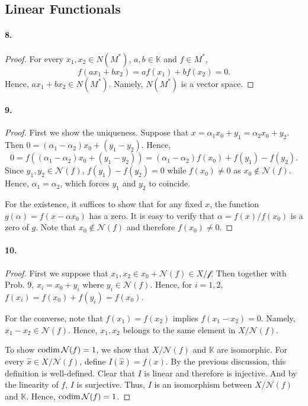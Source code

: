 \subsection{Linear Functionals}
  \paragraph{8.}
  \begin{proof}
    For every $x_1,x_2\in N(M^*)$, $a,b\in\mathbb{K}$ and $f\in M^*$,
    \[
      f(ax_1+bx_2) = af(x_1)+bf(x_2) = 0.
    \]
    Hence, $ax_1+bx_2\in N(M^*)$. Namely, $N(M^*)$ is a vector space.
  \end{proof}

  \paragraph{9.}
  \begin{proof}
    First we show the uniqueness. Suppose that $x=\alpha_1x_0+y_1=\alpha_2x_0+
    y_2$. Then $0 = (\alpha_1-\alpha_2)x_0 + (y_1-y_2)$. Hence,
    \[
      0 = f((\alpha_1-\alpha_2)x_0 + (y_1-y_2)) = 
      (\alpha_1-\alpha_2)f(x_0) + f(y_1)-f(y_2).
    \]
    Since $y_1,y_2\in\mathcal{N}(f)$, $f(y_1)-f(y_2)=0$ while $f(x_0)\ne 0$ as
    $x_0\notin\mathcal{N}(f)$. Hence, $\alpha_1=\alpha_2$, which forces $y_1$ 
    and $y_2$ to coincide.\par
    For the existence, it suffices to show that for any fixed $x$, the function
    $g(\alpha)=f(x-\alpha x_0)$ has a zero. It is easy to verify that $\alpha=
    f(x)/f(x_0)$ is a zero of $g$. Note that $x_0\notin\mathcal{N}(f)$ and 
    therefore $f(x_0)\ne 0$.
  \end{proof}

  \paragraph{10.}
  \begin{proof}
    First we suppose that $x_1,x_2\in x_0+\mathcal{N}(f)\in X/\mathcal{f}$. Then
    together with Prob. 9, $x_i=x_0+y_i$ where $y_i\in\mathcal{N}(f)$. Hence, 
    for $i=1,2$, $f(x_i)=f(x_0)+f(y_i)=f(x_0)$.\par
    For the converse, note that $f(x_1)=f(x_2)$ implies $f(x_1-x_2)=0$. Namely,
    $x_1-x_2\in\mathcal{N}(f)$. Hence, $x_1,x_2$ belongs to the same element in
    $X/\mathcal{N}(f)$.\par
    To show $\operatorname{codim}\mathcal{N}(f)=1$, we show that $X/\mathcal{N}(f)$ and 
    $\mathbb{K}$ are isomorphic. For every $\hat{x}\in X/\mathcal{N}(f)$, define
    $I(\hat{x})=f(x)$. By the previous discussion, this definition is 
    well-defined. Clear that $I$ is linear and therefore is injective. And by 
    the linearity of $f$, $I$ is surjective. Thus, $I$ is an isomorphism between
    $X/\mathcal{N}(f)$ and $\mathbb{K}$. Hence, $\operatorname{codim}\mathcal{N}(f)=1$.
  \end{proof}

